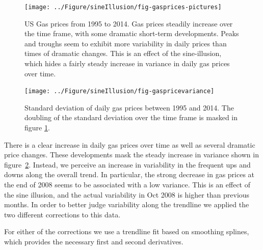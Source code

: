\documentclass[11pt]{isuthesis}\usepackage[]{graphicx}\usepackage[]{color}
\newenvironment{knitrout}{}{} %
\begin{document}
\begin{figure}[h!tbp]
\begin{knitrout}
\color{fgcolor}

{\centering \texttt{[image: ../Figure/sineIllusion/fig-gasprices-pictures]} 

}



\end{knitrout}
\caption[US Gas prices from 1995 to 2014]{US Gas prices from 1995 to 2014. Gas prices steadily increase over the time frame, with some dramatic short-term developments. Peaks and troughs seem to exhibit more variability in daily prices than times of dramatic changes. This is an effect of the sine-illusion, which hides a fairly steady increase in variance in daily gas prices over time.}\label{fig:gasprices}
\end{figure}
\begin{figure}\centering
\begin{knitrout}
\color{fgcolor}

{\centering \texttt{[image: ../Figure/sineIllusion/fig-gaspricevariance]} 

}



\end{knitrout}
\caption[Standard deviation of daily gas prices between 1995 and 2014. ]{Standard deviation of daily gas prices between 1995 and 2014. The doubling of the standard deviation over the time frame is masked in figure \ref{fig:gasprices}.\label{fig:gasvariance}}
\end{figure}
There is a clear increase in daily gas prices over time as well as several dramatic price changes. These developments mask the steady increase in variance shown in figure~\ref{fig:gasvariance}. Instead, we perceive an increase in variability in the frequent ups and downs along the overall trend. In particular, the strong decrease in gas prices at the end of 2008 seems to be associated with a low variance. This is an effect of the sine illusion, and the actual variability in Oct 2008 is higher than previous months. In order to better judge variability along the trendline we applied the two different corrections to this data. 

For either of the corrections we use a trendline fit based on smoothing splines, which provides the necessary first and second derivatives.
\end{document}
